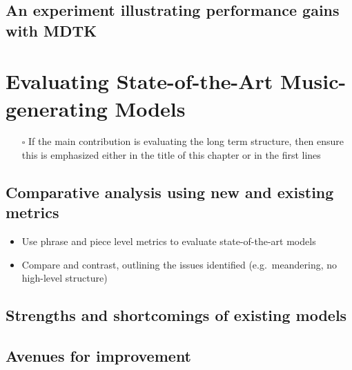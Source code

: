 \documentclass[12pt,a4paper,]{report}
\providecommand{\tightlist}{%
  \setlength{\itemsep}{0pt}\setlength{\parskip}{0pt}}
\begin{document}
\hypertarget{an-experiment-illustrating-performance-gains-with-mdtk}{%
\section{An experiment illustrating performance gains with
MDTK}\label{an-experiment-illustrating-performance-gains-with-mdtk}}

\hypertarget{evaluating-state-of-the-art-music-generating-models}{%
\chapter{Evaluating State-of-the-Art Music-generating
Models}\label{evaluating-state-of-the-art-music-generating-models}}

\begin{itemize}
\tightlist
\item[$\square$]
  If the main contribution is evaluating the long term structure, then
  ensure this is emphasized either in the title of this chapter or in
  the first lines
\end{itemize}

\hypertarget{comparative-analysis-using-new-and-existing-metrics}{%
\section{Comparative analysis using new and existing
metrics}\label{comparative-analysis-using-new-and-existing-metrics}}

\begin{itemize}
\tightlist
\item
  Use phrase and piece level metrics to evaluate state-of-the-art models
\item
  Compare and contrast, outlining the issues identified
  (e.g.~meandering, no high-level structure)
\end{itemize}

\hypertarget{strengths-and-shortcomings-of-existing-models}{%
\section{Strengths and shortcomings of existing
models}\label{strengths-and-shortcomings-of-existing-models}}

\hypertarget{avenues-for-improvement}{%
\section{Avenues for improvement}\label{avenues-for-improvement}}
\end{document}

